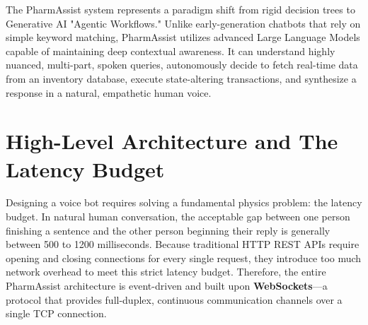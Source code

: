 \documentclass[conference]{IEEEtran}
\begin{document}
The PharmAssist system represents a paradigm shift from rigid decision trees to Generative AI "Agentic Workflows." Unlike early-generation chatbots that rely on simple keyword matching, PharmAssist utilizes advanced Large Language Models capable of maintaining deep contextual awareness. It can understand highly nuanced, multi-part, spoken queries, autonomously decide to fetch real-time data from an inventory database, execute state-altering transactions, and synthesize a response in a natural, empathetic human voice. 

\section{High-Level Architecture and The Latency Budget}
Designing a voice bot requires solving a fundamental physics problem: the latency budget. In natural human conversation, the acceptable gap between one person finishing a sentence and the other person beginning their reply is generally between 500 to 1200 milliseconds. Because traditional HTTP REST APIs require opening and closing connections for every single request, they introduce too much network overhead to meet this strict latency budget. Therefore, the entire PharmAssist architecture is event-driven and built upon \textbf{WebSockets}---a protocol that provides full-duplex, continuous communication channels over a single TCP connection. 
\end{document}
